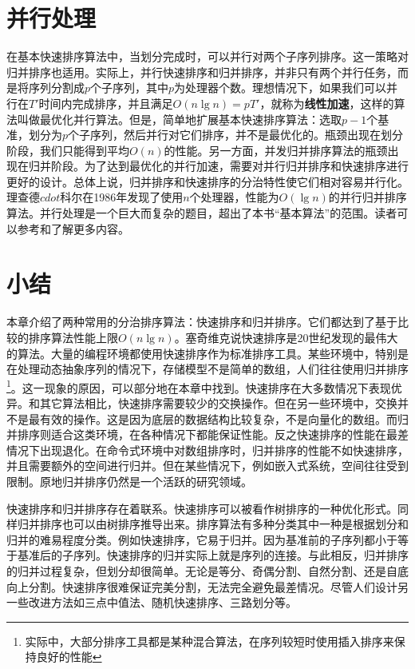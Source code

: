 \documentclass[b5paper]{ctexart}
\begin{document}
\begin{Exercise}
\end{Exercise}

\section{并行处理}

在基本快速排序算法中，当划分完成时，可以并行对两个子序列排序。这一策略对归并排序也适用。实际上，并行快速排序和归并排序，并非只有两个并行任务，而是将序列分割成$p$个子序列，其中$p$为处理器个数。理想情况下，如果我们可以并行在$T'$时间内完成排序，并且满足$O(n \lg n) = p T'$，就称为\textbf{线性加速}，这样的算法叫做最优化并行算法。但是，简单地扩展基本快速排序算法：选取$p-1$个基准，划分为$p$个子序列，然后并行对它们排序，并不是最优化的。瓶颈出现在划分阶段，我们只能得到平均$O(n)$的性能。另一方面，并发归并排序算法的瓶颈出现在归并阶段。为了达到最优化的并行加速，需要对并行归并排序和快速排序进行更好的设计。总体上说，归并排序和快速排序的分治特性使它们相对容易并行化。理查德$cdot$科尔在1986年发现了使用$n$个处理器，性能为$O(\lg n)$的并行归并排序算法\cite{para-msort}。并行处理是一个巨大而复杂的题目，超出了本书“基本算法”的范围。读者可以参考\cite{para-msort}和\cite{para-qsort}了解更多内容。

\section{小结}

本章介绍了两种常用的分治排序算法：快速排序和归并排序。它们都达到了基于比较的排序算法性能上限$O(n \lg n)$。塞奇维克说快速排序是20世纪发现的最伟大的算法。大量的编程环境都使用快速排序作为标准排序工具。某些环境中，特别是在处理动态抽象序列的情况下，存储模型不是简单的数组，人们往往使用归并排序\footnote{实际中，大部分排序工具都是某种混合算法，在序列较短时使用插入排序来保持良好的性能}。这一现象的原因，可以部分地在本章中找到。快速排序在大多数情况下表现优异。和其它算法相比，快速排序需要较少的交换操作。但在另一些环境中，交换并不是最有效的操作。这是因为底层的数据结构比较复杂，不是向量化的数组。而归并排序则适合这类环境，在各种情况下都能保证性能。反之快速排序的性能在最差情况下出现退化。在命令式环境中对数组排序时，归并排序的性能不如快速排序，并且需要额外的空间进行归并。但在某些情况下，例如嵌入式系统，空间往往受到限制。原地归并排序仍然是一个活跃的研究领域。

快速排序和归并排序存在着联系。快速排序可以被看作树排序的一种优化形式。同样归并排序也可以由树排序推导出来\cite{sort-deriving}。排序算法有多种分类\cite{TAOCP}其中一种是根据划分和归并的难易程度分类\cite{algo-fp}。例如快速排序，它易于归并。因为基准前的子序列都小于等于基准后的子序列。快速排序的归并实际上就是序列的连接。与此相反，归并排序的归并过程复杂，但划分却很简单。无论是等分、奇偶分割、自然分割、还是自底向上分割。快速排序很难保证完美分割，无法完全避免最差情况。尽管人们设计另一些改进方法如三点中值法、随机快速排序、三路划分等。
\end{document}
